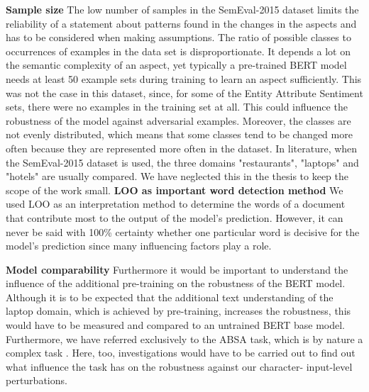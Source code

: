 \textbf{Sample size}
The low number of samples in the SemEval-2015 dataset limits the reliability of a statement about patterns found in the changes in the aspects and has to be considered when making assumptions. The ratio of possible classes to occurrences of examples in the data set is disproportionate. It depends a lot on the semantic complexity of an aspect, yet typically a pre-trained BERT model needs at least 50 example sets during training to learn an aspect sufficiently. This was not the case in this dataset, since, for some of the Entity Attribute Sentiment sets, there were no examples in the training set at all. This could influence the robustness of the model against adversarial examples.
Moreover, the classes are not evenly distributed, which means that some classes tend to be changed more often because they are represented more often in the dataset. 
In literature, when the SemEval-2015 dataset is used, the three domains "restaurants", "laptops" and "hotels" are usually compared. We have neglected this in the thesis to keep the scope of the work small.
\textbf{LOO as important word detection method}
We used LOO as an interpretation method to determine the words of a document that contribute most to the output of the model's prediction. However, it can never be said with 100\% certainty whether one particular word is decisive for the model's prediction since many influencing factors play a role. 

\textbf{Model comparability}
Furthermore it would be important to understand the influence of the additional pre-training on the robustness of the BERT model. Although it is to be expected that the additional text understanding of the laptop domain, which is achieved by pre-training, increases the robustness, this would have to be measured and compared to an untrained BERT base model. 
Furthermore, we have referred exclusively to the ABSA task, which is by nature a complex task \cite{pavlopoulos2014aspect}. Here, too, investigations would have to be carried out to find out what influence the task has on the robustness against our character- input-level perturbations.




